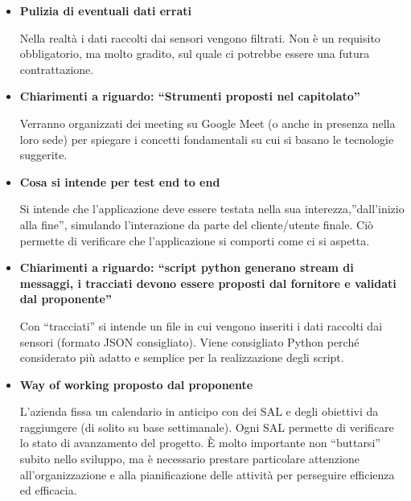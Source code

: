 \documentclass{article}
\begin{document}
\begin{itemize}
\item \textbf{\fontsize{12}{6}\selectfont Pulizia di eventuali dati errati}

Nella realtà i dati raccolti dai sensori vengono filtrati. Non è un requisito obbligatorio, ma molto gradito, sul quale ci potrebbe essere una futura contrattazione. 
\vspace{0.5cm} 

\item \textbf{\fontsize{12}{6}\selectfont Chiarimenti a riguardo: “Strumenti proposti nel capitolato”}

Verranno organizzati dei meeting su Google Meet (o anche in presenza nella loro sede) per spiegare i concetti fondamentali su cui si basano le tecnologie suggerite. 
\vspace{0.5cm} 

\item \textbf{\fontsize{12}{6}\selectfont Cosa si intende per test end to end}

Si intende che l’applicazione deve essere testata nella sua interezza,”dall’inizio alla fine”, simulando l’interazione da parte del cliente/utente finale. Ciò permette di verificare che l’applicazione si comporti come ci si aspetta.
\vspace{0.5cm} 

\item \textbf{\fontsize{12}{6}\selectfont Chiarimenti a riguardo: “script python generano stream di messaggi, i tracciati devono essere proposti dal fornitore e validati dal proponente”}

Con “tracciati” si intende un file in cui vengono inseriti i dati raccolti dai sensori (formato JSON consigliato). Viene consigliato Python perché considerato più adatto e semplice per la realizzazione degli script.
\vspace{0.5cm} 

\item \textbf{\fontsize{12}{6}\selectfont Way of working proposto dal proponente}

L’azienda fissa un calendario in anticipo con dei SAL e degli obiettivi da raggiungere (di solito su base settimanale).
Ogni SAL permette di verificare lo stato di avanzamento del progetto.
È molto importante non “buttarsi” subito nello sviluppo, ma è necessario prestare particolare attenzione all’organizzazione e alla pianificazione delle attività per perseguire efficienza ed efficacia.

\vspace{0.5cm} 


\end{itemize}
\end{document}
